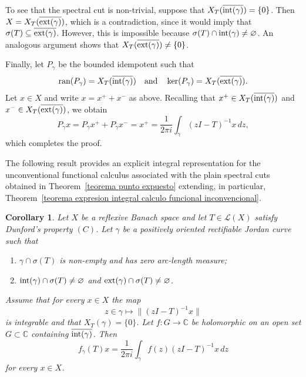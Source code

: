 \documentclass[11pt]{amsart}
\newtheorem{corollary}[theorem]{Corollary}
\theoremstyle{definition}
\newenvironment{demode}
{\noindent {{\it Proof of }}}%
{\par \hfill \fbox{}}
\theoremstyle{remark}
\numberwithin{equation}{section}
\newcommand{\ran}{\textnormal{ran}}
\newcommand{\inte}{\textnormal{int}}
\newcommand{\exte}{\textnormal{ext}}
\begin{document}
\begin{demode}
\smallskip

To see that the spectral cut is non-trivial, suppose that
$X_T(\overline{\inte(\gamma)}) = \{0\}$.
Then $X = X_T(\overline{\exte(\gamma)})$, which is a contradiction, since it would imply that
$\sigma(T) \subseteq \overline{\exte(\gamma)}$.
However, this is impossible because $\sigma(T) \cap \inte(\gamma) \neq \varnothing$.
An analogous argument shows that $X_T(\overline{\exte(\gamma)}) \neq \{0\}$.

\smallskip

Finally, let $P_\gamma$ be the bounded idempotent such that
$$
\ran(P_\gamma) = X_T(\overline{\inte(\gamma)})
\quad\text{and}\quad
\ker(P_\gamma) = X_T(\overline{\exte(\gamma)}).
$$
Let $x\in X$ and write $x = x^+ + x^-$ as above. Recalling that
$x^+ \in X_T(\overline{\inte(\gamma)})$ and $x^- \in X_T(\overline{\exte(\gamma)})$, we obtain
$$
P_\gamma x = P_\gamma x^+ + P_\gamma x^- = x^+
= \frac{1}{2\pi i} \int_\gamma (zI - T)^{-1}x \, dz,
$$
which completes the proof.
\end{demode}

\smallskip


\smallskip

The following result provides an explicit integral representation for the unconventional functional calculus associated with the plain spectral cuts obtained in Theorem~\ref{teorema punto expuesto} extending, in particular, Theorem~\ref{teorema expresion integral calculo funcional inconvencional}.

\begin{corollary}\label{corolario calculo funcinonal local resolvent}
Let $X$ be a reflexive Banach space and let $T\in \mathcal{L}(X)$ satisfy Dunford's property $(C)$. Let $\gamma$ be a positively oriented rectifiable Jordan curve such that
\begin{enumerate}
\item[(i)] $\gamma \cap \sigma(T)$ is non-empty and has zero arc-length measure;
\item[(ii)] $\inte(\gamma)\cap\sigma(T)\neq\varnothing$ and $\exte(\gamma)\cap\sigma(T)\neq\varnothing$.
\end{enumerate}
Assume that for every $x\in X$ the map
$$
z\in\gamma \longmapsto \|(zI-T)^{-1}x\|
$$
is integrable and that $X_T(\gamma)=\{0\}$. Let $f:G\to\mathbb{C}$ be holomorphic on an open set $G\subset\mathbb{C}$ containing $\overline{\inte(\gamma)}$. Then
    $$
f_{\gamma}(T)x=\frac{1}{2\pi i}\int_{\gamma} f(z)(zI-T)^{-1}x\,dz
    $$
for every $x\in X$.
\end{corollary}
\end{document}
